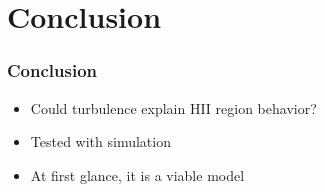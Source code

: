 \documentclass[aspectratio=169,compress]{beamer}
\begin{document}
\section{Conclusion}
\begin{frame}
  \frametitle{Conclusion}
  \begin{itemize}
    \item Could turbulence explain HII region behavior?
    \item Tested with simulation
    \item At first glance, it is a viable model
  \end{itemize}
\end{frame}
\end{document}
